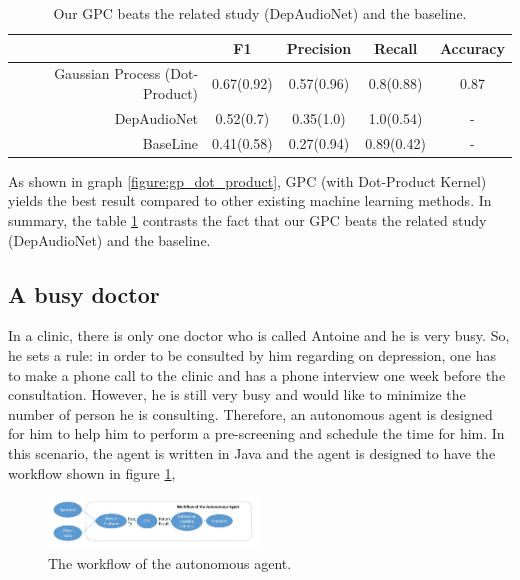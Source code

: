 \documentclass{article}
\begin{document}
 	    
        \begin{table}[h!]
            \begin{center}
                \begin{tabular}{ | r | c | c | c | c | }
                 \hline
                                                    & \bfseries F1	& \bfseries Precision 	& \bfseries Recall      & \bfseries Accuracy \\ \hline
                 Gaussian Process (Dot-Product)		& 0.67(0.92) 	& 0.57(0.96)            & 0.8(0.88)			    & 0.87 \\ \hline
                 DepAudioNet	                    & 0.52(0.7) 	& 0.35(1.0)	    		& 1.0(0.54)             & -  \\ \hline
                 BaseLine                       	& 0.41(0.58) 	& 0.27(0.94)			& 0.89(0.42)            & -  \\ \hline
                 \end{tabular}
            \end{center}
        \caption{Our GPC beats the related study (DepAudioNet) and the baseline.}
        \label{table:comparisionOfGPModelWithOthers}
        \end{table}

        As shown in graph \ref{figure:gp_dot_product}, GPC (with Dot-Product Kernel) yields the best result compared to other existing machine learning methods. 
        In summary, the table \ref{table:comparisionOfGPModelWithOthers} contrasts the fact that our GPC beats the related study (DepAudioNet) and the baseline.

	\subsection{A busy doctor}
	In a clinic, there is only one doctor who is called Antoine and he is very busy. 
	So, he sets a rule: in order to be consulted by him regarding on depression, 
	one has to make a phone call to the clinic and has a phone interview one week before the consultation. 
	However, he is still very busy and would like to minimize the number of person he is consulting. 
	Therefore, an autonomous agent is designed for him to help him to perform a pre-screening and schedule the time for him.
	In this scenario, the agent is written in Java and the agent is designed to have the workflow shown in figure \ref{figure:workflow_agent},

	\begin{figure}[h]
	    \begin{center}
		\includegraphics[width=0.5\textwidth]{workflow_agent}
	    \end{center}
	    \caption{The workflow of the autonomous agent.}
	    \label{figure:workflow_agent}
	\end{figure}
	
\end{document}
